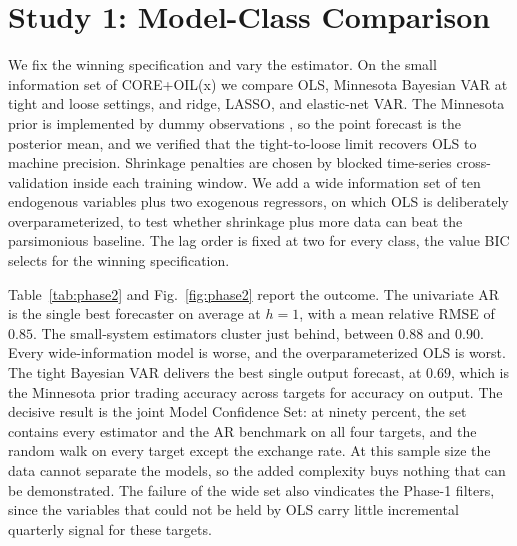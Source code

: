 \documentclass[conference]{IEEEtran}
\begin{document}
\section{Study 1: Model-Class Comparison}
We fix the winning specification and vary the estimator. On the small information set of CORE+OIL(x) we compare OLS, Minnesota Bayesian VAR at tight and loose settings, and ridge, LASSO, and elastic-net VAR. The Minnesota prior is implemented by dummy observations \cite{bgr2010}, so the point forecast is the posterior mean, and we verified that the tight-to-loose limit recovers OLS to machine precision. Shrinkage penalties are chosen by blocked time-series cross-validation inside each training window. We add a wide information set of ten endogenous variables plus two exogenous regressors, on which OLS is deliberately overparameterized, to test whether shrinkage plus more data can beat the parsimonious baseline. The lag order is fixed at two for every class, the value BIC selects for the winning specification.

Table~\ref{tab:phase2} and Fig.~\ref{fig:phase2} report the outcome. The univariate AR is the single best forecaster on average at $h=1$, with a mean relative RMSE of $0.85$. The small-system estimators cluster just behind, between $0.88$ and $0.90$. Every wide-information model is worse, and the overparameterized OLS is worst. The tight Bayesian VAR delivers the best single output forecast, at $0.69$, which is the Minnesota prior trading accuracy across targets for accuracy on output. The decisive result is the joint Model Confidence Set: at ninety percent, the set contains every estimator and the AR benchmark on all four targets, and the random walk on every target except the exchange rate. At this sample size the data cannot separate the models, so the added complexity buys nothing that can be demonstrated. The failure of the wide set also vindicates the Phase-1 filters, since the variables that could not be held by OLS carry little incremental quarterly signal for these targets.
\end{document}
